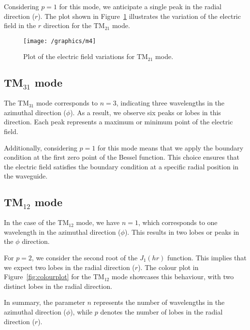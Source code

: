 Considering $p=1$ for this mode, we anticipate a single peak in the radial direction ($r$). The plot shown in Figure~\ref{fig:m4} illustrates the variation of the electric field in the $r$ direction for the TM$_{21}$ mode.
\begin{figure}[h]
\centering
\texttt{[image: /graphics/m4]}
\caption{Plot of the electric field variations for TM$_{21}$ mode.}
\label{fig:m4}
\end{figure}

\subsection{TM$_{31}$ mode}
The TM$_{31}$ mode corresponds to $n=3$, indicating three wavelengths in the azimuthal direction ($\phi$). As a result, we observe six peaks or lobes in this direction. Each peak represents a maximum or minimum point of the electric field.

Additionally, considering $p=1$ for this mode means that we apply the boundary condition at the first zero point of the Bessel function. This choice ensures that the electric field satisfies the boundary condition at a specific radial position in the waveguide.

\subsection{TM$_{12}$ mode}
In the case of the TM$_{12}$ mode, we have $n=1$, which corresponds to one wavelength in the azimuthal direction ($\phi$). This results in two lobes or peaks in the $\phi$ direction.

For $p=2$, we consider the second root of the $J_1(hr)$ function. This implies that we expect two lobes in the radial direction ($r$). The colour plot in Figure~\ref{fig:colourplot} for the TM$_{12}$ mode showcases this behaviour, with two distinct lobes in the radial direction.

In summary, the parameter $n$ represents the number of wavelengths in the azimuthal direction ($\phi$), while $p$ denotes the number of lobes in the radial direction ($r$).
   
